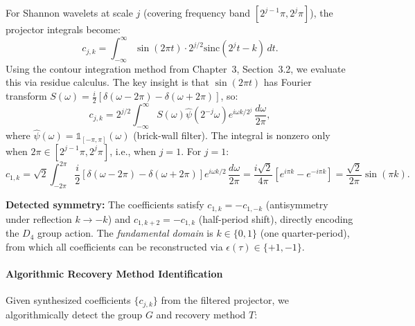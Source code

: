 For Shannon wavelets at scale $j$ (covering frequency band $[2^{j-1}\pi, 2^j\pi]$), the projector integrals become:
\[
c_{j,k} = \int_{-\infty}^\infty \sin(2\pi t) \cdot 2^{j/2} \text{sinc}(2^j t - k) \, dt.
\]
Using the contour integration method from Chapter~3, Section~3.2, we evaluate this via residue calculus. The key insight is that $\sin(2\pi t)$ has Fourier transform $S(\omega) = \frac{i}{2}[\delta(\omega - 2\pi) - \delta(\omega + 2\pi)]$, so:
\[
c_{j,k} = 2^{j/2} \int_{-\infty}^\infty S(\omega) \widehat{\psi}(2^{-j}\omega) e^{i\omega k / 2^j} \, \frac{d\omega}{2\pi},
\]
where $\widehat{\psi}(\omega) = \mathbb{1}_{[-\pi,\pi]}(\omega)$ (brick-wall filter). The integral is nonzero only when $2\pi \in [2^{j-1}\pi, 2^j\pi]$, i.e., when $j=1$. For $j=1$:
\[
c_{1,k} = \sqrt{2} \int_{-2\pi}^{2\pi} \frac{i}{2}[\delta(\omega - 2\pi) - \delta(\omega + 2\pi)] e^{i\omega k / 2} \, \frac{d\omega}{2\pi} = \frac{i\sqrt{2}}{4\pi}[e^{i\pi k} - e^{-i\pi k}] = \frac{\sqrt{2}}{2\pi}\sin(\pi k).
\]

\noindent\textbf{Detected symmetry:} The coefficients satisfy $c_{1,k} = -c_{1,-k}$ (antisymmetry under reflection $k \to -k$) and $c_{1,k+2} = -c_{1,k}$ (half-period shift), directly encoding the $D_4$ group action. The \emph{fundamental domain} is $k \in \{0, 1\}$ (one quarter-period), from which all coefficients can be reconstructed via $\epsilon(\tau) \in \{+1, -1\}$.

\paragraph{Algorithmic Recovery Method Identification}

Given synthesized coefficients $\{c_{j,k}\}$ from the filtered projector, we algorithmically detect the group $G$ and recovery method $T$:

